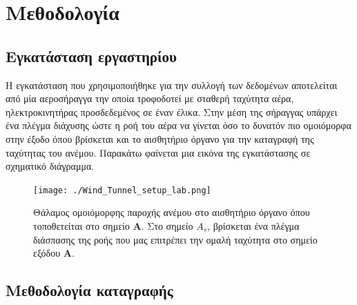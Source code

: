 \documentclass[breaklines=true, 12pt]{article}
\begin{document}
\section{Μεθοδολογία}
\label{sec:org06029b3}
\subsection{Εγκατάσταση εργαστηρίου}
\label{sec:org2bc5a23}
    Η εγκατάσταση που χρησιμοποιήθηκε για την συλλογή των δεδομένων
αποτελείται από μία αεροσήραγγα την οποία τροφοδοτεί με σταθερή ταχύτητα
αέρα, ηλεκτροκινητήρας προσδεδεμένος σε έναν έλικα. Στην μέση της
σήραγγας υπάρχει ένα πλέγμα διάχυσης ώστε η ροή του αέρα να γίνεται όσο
το δυνατόν πιο ομοιόμορφα στην έξοδο όπου βρίσκεται και το αισθητήριο
όργανο για την καταγραφή της ταχύτητας του ανέμου. Παρακάτω φαίνεται μια
εικόνα της εγκατάστασης σε σχηματικό διάγραμμα.

\begin{figure}[htbp]
\centering
\texttt{[image: ./Wind\_Tunnel\_setup\_lab.png]}
\caption{Θάλαμος ομοιόμορφης παροχής ανέμου στο αισθητήριο όργανο όπου τοποθετείται στο σημείο \textbf{Α}. Στο σημείο  \textbf{\(A_{s}\)}, βρίσκεται ένα πλέγμα διάσπασης της ροής που μας επιτρέπει την ομαλή ταχύτητα στο σημείο εξόδου \textbf{A}.}
\end{figure}
\clearpage
\subsection{Μεθοδολογία καταγραφής}
\label{sec:org493f9a6}
\end{document}
